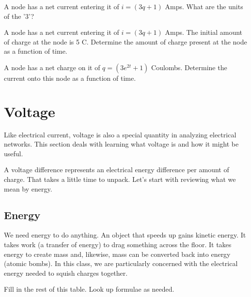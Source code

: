 \begin{alevel}
A node has a net current entering it of $i=(3q+1)$ Amps. What are the units of the '3'?
\end{alevel}

\begin{clevel}
A node has a net current entering it of $i=(3q+1)$ Amps. The initial amount of charge at the node  is 5 C. Determine the amount of charge present at the node as a function of time.
\end{clevel}

\begin{clevel}
A node has a net charge on it of $q=(3e^{2t}+1)$ Coulombs. Determine the current onto this node as a function of time.
\end{clevel}

\section{Voltage}
Like electrical current, voltage is also a special quantity in analyzing electrical networks. This section deals with learning what voltage is and how it might be useful.\par

A voltage difference represents an electrical energy difference per amount of charge. That takes a little time to unpack. Let's start with reviewing what we mean by energy.

\subsection{Energy}
We need energy to do anything. An object that speeds up gains kinetic energy. It takes work (a transfer of energy) to drag something across the floor. It takes energy to create mass and, likewise, mass can be converted back into energy (atomic bombs). In this class, we are particularly concerned with the electrical energy needed to squish charges together.
\par
\begin{clevel}
Fill in the rest of this table. Look up formulae as needed.
\end{clevel}

